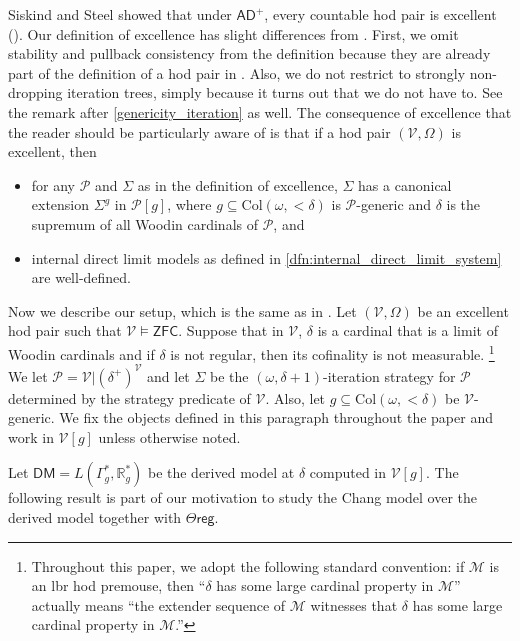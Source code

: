 \documentclass{amsart}
\renewcommand{\subset}{\subseteq}
\begin{document}
Siskind and Steel showed that under $\mathsf{AD}^+$, every countable hod pair is excellent (\cite{CPMP, full_normalization}).
Our definition of excellence has slight differences from \cite[Definition 2.1]{CoveringChang}.
First, we omit stability and pullback consistency from the definition because they are already part of the definition of a hod pair in \cite{CPMP}.
Also, we do not restrict to strongly non-dropping iteration trees, simply because it turns out that we do not have to.
See the remark after \cref{genericity_iteration} as well.
The consequence of excellence that the reader should be particularly aware of is that if a hod pair $(\mathcal{V}, \Omega)$ is excellent, then 
\begin{itemize}
    \item for any $\mathcal{P}$ and $\Sigma$ as in the definition of excellence, $\Sigma$ has a canonical extension $\Sigma^g$ in $\mathcal{P}[g]$, where $g\subset\mathrm{Col}(\omega, {<}\delta)$ is $\mathcal{P}$-generic and $\delta$ is the supremum of all Woodin cardinals of $\mathcal{P}$, and
    \item internal direct limit models as defined in \cref{dfn:internal_direct_limit_system} are well-defined.
\end{itemize}

Now we describe our setup, which is the same as in \cite{CoveringChang}.
Let $(\mathcal{V}, \Omega)$ be an excellent hod pair such that $\mathcal{V}\models\mathsf{ZFC}$.
Suppose that in $\mathcal{V}$, $\delta$ is a cardinal that is a limit of Woodin cardinals and if $\delta$ is not regular, then its cofinality is not measurable.
\footnote{Throughout this paper, we adopt the following standard convention: if $\mathcal{M}$ is an lbr hod premouse, then ``$\delta$ has some large cardinal property in $\mathcal{M}$'' actually means ``the extender sequence of $\mathcal{M}$ witnesses that $\delta$ has some large cardinal property in $\mathcal{M}$.''}
We let $\mathcal{P}=\mathcal{V}\vert(\delta^+)^{\mathcal{V}}$ and let $\Sigma$ be the $(\omega, \delta+1)$-iteration strategy for $\mathcal{P}$ determined by the strategy predicate of $\mathcal{V}$.
Also, let $g\subset\mathrm{Col}(\omega, {<}\delta)$ be $\mathcal{V}$-generic.
We fix the objects defined in this paragraph throughout the paper and work in $\mathcal{V}[g]$ unless otherwise noted.

Let $\mathsf{DM}=L(\Gamma^*_g, \mathbb{R}^*_g)$ be the derived model at $\delta$ computed in $\mathcal{V}[g]$.
The following result is part of our motivation to study the Chang model over the derived model together with $\Theta\mathsf{reg}$.
\end{document}
